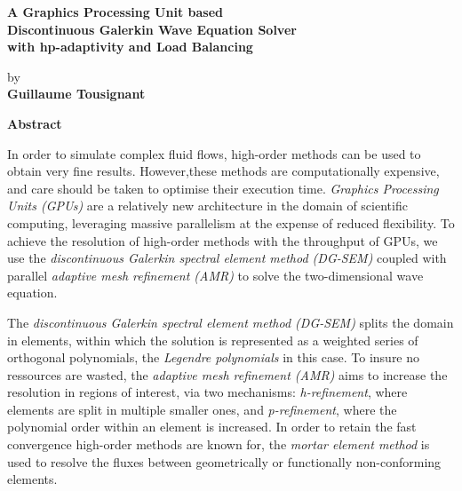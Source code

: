 \thispagestyle{plain} %

\begin{center}
	\vspace*{0.5cm} %
	{ \Large
		\textbf{A Graphics Processing Unit based \\ 
			Discontinuous Galerkin Wave Equation Solver \\
			with hp-adaptivity and Load Balancing \\
		}
	}
	\vspace{0.4cm}
	\large

	by \\
	\vspace{0.4cm}
	\textbf{Guillaume Tousignant}
	
	\vspace{0.9cm}
	\textbf{Abstract}
	
\end{center}

In order to simulate complex fluid flows, high-order methods can be used to obtain very fine 
results. However,these methods are computationally expensive, and care should be taken to optimise 
their execution time. \textit{Graphics Processing Units (GPUs)} are a relatively new architecture 
in the domain of scientific computing, leveraging massive parallelism at the expense of reduced 
flexibility. To achieve the resolution of high-order methods with the throughput of GPUs, we use 
the \textit{discontinuous Galerkin spectral element method (DG-SEM)} coupled with parallel 
\textit{adaptive mesh refinement (AMR)} to solve the two-dimensional wave equation. 

The \textit{discontinuous Galerkin spectral element method (DG-SEM)} splits the domain in elements, 
within which the solution is represented as a weighted series of orthogonal polynomials, the 
\textit{Legendre polynomials} in this case. To insure no ressources are wasted, the 
\textit{adaptive mesh refinement (AMR)} aims to increase the resolution in regions of interest, via 
two mechanisms: \textit{h-refinement}, where elements are split in multiple smaller ones, and 
\textit{p-refinement}, where the polynomial order within an element is increased. In order to retain 
the fast convergence high-order methods are known for, the \textit{mortar element method} is used to
resolve the fluxes between geometrically or functionally non-conforming elements.

